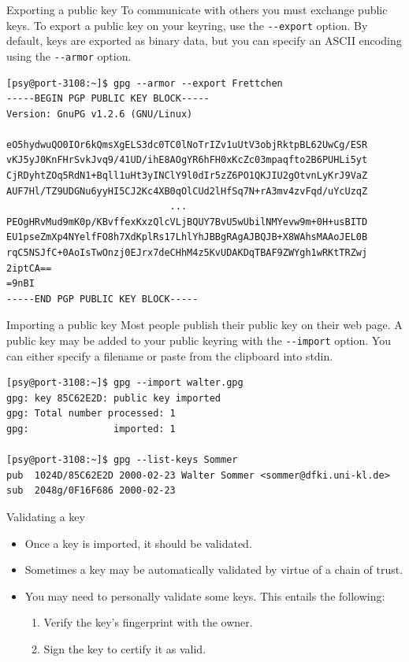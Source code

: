 \documentclass[%
mode=present,%
paper=screen%
]{powerdot}
\newcommand{\clopt}[1]{\texttt{{-}#1}}
\begin{document}
\makeatletter\renewcommand{\verbatim@font}{\scriptsize\tt}\makeatother
\begin{slide}[method=direct]{Exporting a public key}
To communicate with others you must exchange public keys.  To export a
public key on your keyring, use the \clopt{-export} option.  By
default, keys are exported as binary data, but you can specify an
ASCII encoding using the \clopt{-armor} option.\\[1ex]
\begin{verbatim}
[psy@port-3108:~]$ gpg --armor --export Frettchen
-----BEGIN PGP PUBLIC KEY BLOCK-----
Version: GnuPG v1.2.6 (GNU/Linux)

eO5hydwuQO0IOr6kQmsXgELS3dc0TC0lNoTrIZv1uUtV3objRktpBL62UwCg/ESR
vKJ5yJ0KnFHrSvkJvq9/41UD/ihE8AOgYR6hFH0xKcZc03mpaqfto2B6PUHLi5yt
CjRDyhtZOq5RdN1+Bqll1uHt3yINClY9l0dIr5zZ6PO1QKJIU2gOtvnLyKrJ9VaZ
AUF7Hl/TZ9UDGNu6yyHI5CJ2Kc4XB0qOlCUd2lHfSq7N+rA3mv4zvFqd/uYcUzqZ
                             ...
PEOgHRvMud9mK0p/KBvffexKxzQlcVLjBQUY7BvU5wUbilNMYevw9m+0H+usBITD
EU1pseZmXp4NYelfFO8h7XdKplRs17LhlYhJBBgRAgAJBQJB+X8WAhsMAAoJEL0B
rqC5NSJfC+0AoIsTwOnzj0EJrx7deCHhM4z5KvUDAKDqTBAF9ZWYgh1wRKtTRZwj
2iptCA==
=9nBI
-----END PGP PUBLIC KEY BLOCK-----
\end{verbatim}%
\end{slide}

\begin{slide}[method=direct]{Importing a public key}
  Most people publish their public key on their web page.  A public
  key may be added to your public keyring with the \clopt{-import}
  option. You can either specify a filename or paste from the
  clipboard into stdin.\\[1ex]
\begin{verbatim}
[psy@port-3108:~]$ gpg --import walter.gpg
gpg: key 85C62E2D: public key imported
gpg: Total number processed: 1
gpg:               imported: 1

[psy@port-3108:~]$ gpg --list-keys Sommer
pub  1024D/85C62E2D 2000-02-23 Walter Sommer <sommer@dfki.uni-kl.de>
sub  2048g/0F16F686 2000-02-23
\end{verbatim}
\end{slide}

\begin{slide}{Validating a key}
  \begin{itemize}
  \item Once a key is imported, it should be validated.
  \item Sometimes a key may be automatically validated by virtue of a
    chain of trust.
  \item You may need to personally validate some keys.  This entails
    the following:
    \begin{enumerate}
    \item Verify the key's fingerprint with the owner.
    \item Sign the key to certify it as valid.
    \end{enumerate}
  \end{itemize}
\end{slide}
\end{document}
